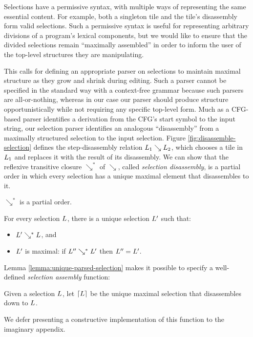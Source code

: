 Selections have a permissive syntax, with multiple
ways of representing the same essential content.
For example, both a singleton tile and the tile's disassembly
form valid selections.
Such a permissive syntax is useful for representing
arbitrary divisions of a program's
lexical components, but we would like to ensure
that the divided selections remain ``maximally assembled''
in order to inform the user of the top-level structures
they are manipulating.

This calls for defining an appropriate
parser on selections to maintain
maximal structure as they grow and shrink during editing.
Such a parser cannot be specified in the standard way
with a context-free grammar because such parsers are
all-or-nothing, whereas in our case our parser should
produce structure opportunistically while not requiring any
specific top-level form.
Much as a CFG-based parser identifies a derivation from
the CFG's start symbol to the input string,
our selection parser identifies an analogous ``disassembly'' from
a maximally structured selection to the input selection.
Figure \ref{fig:disassemble-selection} defines the step-disassembly relation $L_1\searrow L_2$,
which chooses a tile in $L_1$ and replaces it with the
result of its disassembly.
We can show that the reflexive transitive
closure $\searrow^*$ of $\searrow$, called \emph{selection disassembly},
is a partial order in
which every selection has a unique maximal element that
disassembles to it.
\begin{lemma}
  $\searrow^*$ is a partial order.
\end{lemma}
\begin{lemma}\label{lemma:unique-parsed-selection}
  For every selection $L$, there is a unique
  selection $L'$ such that:
  \begin{itemize}
  \item $L'\searrow^*L$, and
  \item $L'$ is maximal: if $L''\searrow^*L'$ then $L'' = L'$.
  \end{itemize}
\end{lemma}
Lemma \ref{lemma:unique-parsed-selection} makes it
possible to specify a well-defined \emph{selection assembly}
function:
\begin{definition}
  Given a selection $L$, let $\left\lceil L\right\rceil$ be
  the unique maximal selection that disassembles down
  to $L$.
\end{definition}
We defer presenting a constructive implementation of this function
to the imaginary appendix.

